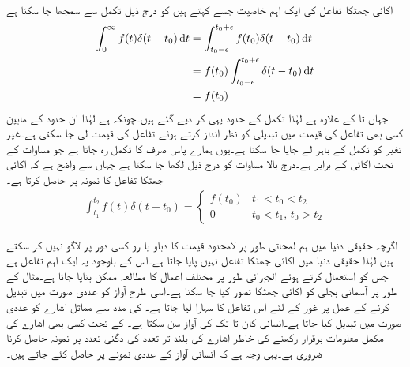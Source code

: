 اکائی جھٹکا تفاعل کی ایک اہم خاصیت جسے  کہتے ہیں کو درج ذیل تکمل سے سمجھا جا سکتا ہے
\begin{align*}
\int_0^{\infty} f(t) \delta(t-t_0) \dif t&=\int_{t_0-\epsilon}^{t_0+\epsilon} f(t_0) \delta(t-t_0) \dif t\\
&=f(t_0) \int_{t_0-\epsilon}^{t_0+\epsilon} \delta(t-t_0) \dif t\\
&= f(t_0)
\end{align*}
جہاں  تا  کے علاوہ  ہے لہٰذا تکمل کے حدود یہی کر دیے گئے ہیں۔چونکہ  ہے لہٰذا ان حدود کے مابین کسی بھی تفاعل کی قیمت میں تبدیلی کو نظر انداز کرتے ہوئے تفاعل کی قیمت  لی جا سکتی ہے۔غیر تغیر  کو تکمل کے باہر لے جایا جا سکتا ہے۔یوں ہمارے پاس صرف  کا تکمل رہ جاتا ہے جو مساوات  کے تحت اکائی کے برابر ہے۔درج بالا مساوات کو درج ذیل لکھا جا سکتا ہے جہاں سے واضح ہے کہ اکائی جھٹکا تفاعل  کا نمونہ  پر حاصل کرتا ہے۔
\begin{align}\label{مساوات_لاپلاس_خاصیت_نمونہ_بندی}
\int_{t_1}^{t_2} f(t) \delta(t-t_0)=
\begin{cases}
f(t_0)& t_1<t_0<t_2\\
0&t_0<t_1, \, t_0>t_2 
\end{cases}
\end{align}

اگرچہ حقیقی دنیا میں ہم لمحاتی طور پر لامحدود قیمت کا دباو یا رو کسی دور پر لاگو نہیں کر سکتے  ہیں لہٰذا حقیقی دنیا میں اکائی جھٹکا تفاعل نہیں پایا جاتا ہے۔اس کے باوجود یہ ایک اہم تفاعل ہے جس کو استعمال کرتے ہوئے الجبرائی طور پر مختلف اعمال کا مطالعہ ممکن بنایا جاتا ہے۔مثال کے طور پر آسمانی بجلی کو اکائی جھٹکا تصور کیا جا سکتا ہے۔اسی طرح آواز کو عددی صورت میں تبدیل کرنے کے عمل پر غور کے لئے اس تفاعل کا سہارا لیا جاتا ہے۔  کی مدد سے مماثل اشارے کو عددی صورت میں  تبدیل کیا جاتا ہے۔انسانی کان  تا  تک کی آواز سن سکتا ہے۔  کے تحت کسی بھی اشارے کی مکمل معلومات برقرار رکھنے کی خاطر اشارے کی بلند تر تعدد کی دگنی تعدد پر نمونہ حاصل کرنا ضروری ہے۔یہی وجہ ہے کہ انسانی آواز کے عددی نمونے  پر حاصل کئے جاتے ہیں۔

